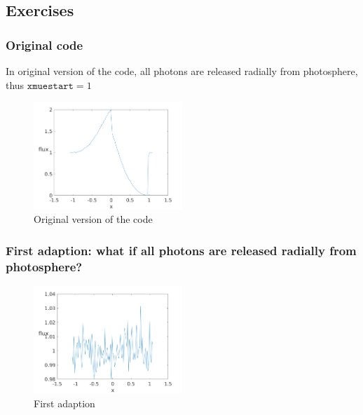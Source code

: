 \documentclass[../main/main.tex]{subfiles}
\begin{document}
\newpage
\subsection{Exercises}
\subsubsection{Original code}
In original version of the code, all photons are released radially from photosphere, thus $\texttt{xmuestart} = 1$

\begin{figure}[!htp]
\centering
\includegraphics[width=0.5\textwidth]{../../introductory_exercises/P_Cygni_profile_UV_resonance/npot6xk0100alpha0beta1test0.png}
\caption{Original version of the code}
\end{figure}

\subsubsection{First adaption: what if all photons are released radially from photosphere?}
\begin{figure}[!htbp]
\centering
\includegraphics[width=0.5\textwidth]{../../introductory_exercises/P_Cygni_profile_UV_resonance/npot6xk0100alpha0beta1test1.png}
\caption{First adaption}
\end{figure}
\end{document}

